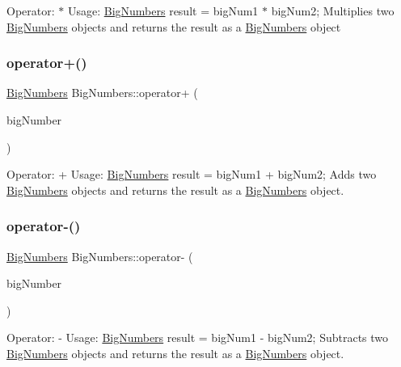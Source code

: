 Operator\+: $\ast$ Usage\+: \mbox{\hyperlink{class_big_numbers}{Big\+Numbers}} result = big\+Num1 $\ast$ big\+Num2; Multiplies two \mbox{\hyperlink{class_big_numbers}{Big\+Numbers}} objects and returns the result as a \mbox{\hyperlink{class_big_numbers}{Big\+Numbers}} object \mbox{\label{class_big_numbers_a680111de22672f72e0e102b42352d3bc}} 
\subsubsection{\texorpdfstring{operator+()}{operator+()}}
{\footnotesize\ttfamily \mbox{\hyperlink{class_big_numbers}{Big\+Numbers}} Big\+Numbers\+::operator+ (\begin{DoxyParamCaption}\item[{const \mbox{\hyperlink{class_big_numbers}{Big\+Numbers}} \&}]{big\+Number }\end{DoxyParamCaption})}

Operator\+: + Usage\+: \mbox{\hyperlink{class_big_numbers}{Big\+Numbers}} result = big\+Num1 + big\+Num2; Adds two \mbox{\hyperlink{class_big_numbers}{Big\+Numbers}} objects and returns the result as a \mbox{\hyperlink{class_big_numbers}{Big\+Numbers}} object. \mbox{\label{class_big_numbers_ad4b60c48e9da0bd5f9845d7ce73bdc90}} 
\subsubsection{\texorpdfstring{operator-\/()}{operator-()}}
{\footnotesize\ttfamily \mbox{\hyperlink{class_big_numbers}{Big\+Numbers}} Big\+Numbers\+::operator-\/ (\begin{DoxyParamCaption}\item[{const \mbox{\hyperlink{class_big_numbers}{Big\+Numbers}} \&}]{big\+Number }\end{DoxyParamCaption})}

Operator\+: -\/ Usage\+: \mbox{\hyperlink{class_big_numbers}{Big\+Numbers}} result = big\+Num1 -\/ big\+Num2; Subtracts two \mbox{\hyperlink{class_big_numbers}{Big\+Numbers}} objects and returns the result as a \mbox{\hyperlink{class_big_numbers}{Big\+Numbers}} object. \mbox{\label{class_big_numbers_af7ad124c6e92a0ae647f3aa3cd85f11a}} 
